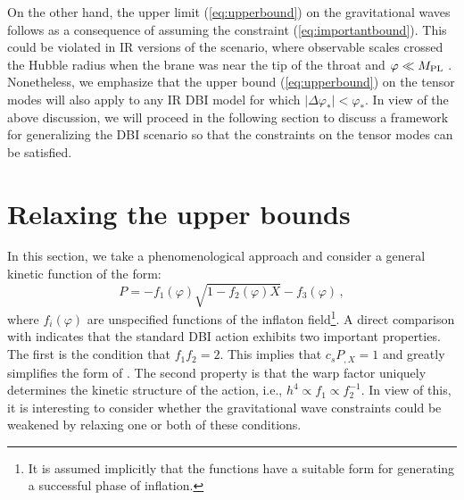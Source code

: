 On the other hand, 
the upper limit (\ref{eq:upperbound}) on the gravitational waves 
follows as a consequence of assuming 
the constraint (\ref{eq:importantbound}). This  
could be violated in IR versions of the scenario, where
observable scales crossed the Hubble radius when the 
brane was near the tip of the throat and $\varphi \ll M_{\mathrm{PL}}$
\cite{brane12,brane14}. 
Nonetheless, we emphasize that the upper bound (\ref{eq:upperbound})
on the tensor modes 
will also apply to any IR DBI model for which 
$|\Delta \varphi_* | < \varphi_*$.  
In view of the above discussion, 
we will proceed in the following section
to discuss a framework for generalizing the DBI scenario so 
that the constraints on the tensor modes can be satisfied. 
% 
% 
% 
% 
\section{Relaxing the upper bounds}
% 
\label{sec:relaxing-dbi}
% 
In this section, we take a phenomenological 
approach and consider a general kinetic function of the form:
% 
\begin{equation}
\label{eq:genaction-dbi}
P= -f_1 (\varphi ) \sqrt{1-f_2 (\varphi ) X} -f_3 (\varphi) \,,
\end{equation}
% 
where $f_i (\varphi )$ are unspecified functions of the inflaton 
field\footnote{It is assumed 
implicitly that the functions have a suitable form for 
generating a successful phase of inflation.}.
A direct comparison with  
indicates that the standard DBI action exhibits two important properties. 
The first is the condition that $f_1 f_2 =2$. This implies that 
$c_sP_{,X} =1$ and greatly simplifies the form of . 
The second property is that the warp factor uniquely determines 
the kinetic structure of the action, i.e., $h^4 \propto f_1 \propto f_2^{-1}$.  
In view of this, it is interesting to consider whether
the gravitational wave constraints could be weakened by relaxing one 
or both of these conditions. 


